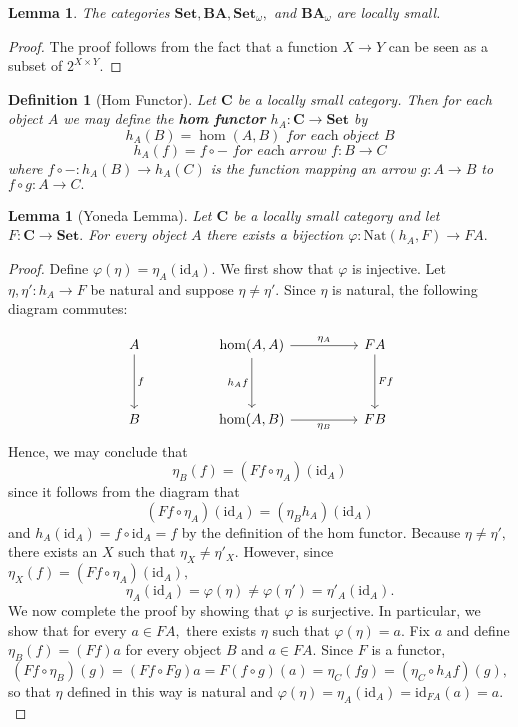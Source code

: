 \documentclass{article}
\newtheorem{lemma}[proposition]{Lemma}
\newtheorem{definition}[proposition]{Definition}
\numberwithin{equation}{section}
\newcommand{\cat}[1]{{\mathbf{#1}}}
\newcommand{\id}{\mathrm{id}}
\newcommand{\Nat}{\mathrm{Nat}}
\begin{document}
\begin{lemma}
The categories $\cat{Set}, \cat{BA}, \cat{Set}_\omega,$ and $\cat{BA}_\omega$ are locally small. 
\end{lemma}

\begin{proof}
The proof follows from the fact that a function $X \to Y$ can be seen as a subset of $2^{X \times Y}.$
\end{proof}

\begin{definition}[Hom Functor]
Let $\cat{C}$ be a locally small category. Then for each object $A$ we may define the \textbf{hom functor} $h_A : \cat{C} \to \cat{Set}$ by $$h_A(B) = \hom(A, B) \textit{ for each object } B$$ $$h_A(f) = f \circ - \textit{ for each arrow } f : B \to C$$ where $f \circ - : h_A(B) \to h_A(C)$ is the function mapping an arrow $g : A \to B$ to $f \circ g : A \to C.$
\end{definition}


\begin{lemma}[Yoneda Lemma]
Let $\cat{C}$ be a locally small category and let $F : \cat{C} \to \cat{Set}.$ For every object $A$ there exists a bijection $\varphi : \Nat(h_A, F) \to FA.$
\end{lemma}

\begin{proof}
Define $\varphi(\eta) = \eta_A(\id_A).$ We first show that $\varphi$ is injective. Let $\eta, \eta' : h_A \to F$ be natural and suppose $\eta \neq \eta'.$ Since $\eta$ is natural, the following diagram commutes:

$$
\begin{tikzcd}
	A && {\hom(A, A)} && FA \\
	\\
	B && {\hom(A, B)} && FB
	\arrow["f", from=1-1, to=3-1]
	\arrow["{h_Af}"', from=1-3, to=3-3]
	\arrow["{\eta_A}", from=1-3, to=1-5]
	\arrow["{\eta_B}"', from=3-3, to=3-5]
	\arrow["Ff", from=1-5, to=3-5]
\end{tikzcd}
$$
Hence, we may conclude that $$\eta_B(f) = (Ff \circ \eta_A)(\id_A)$$ since it follows from the diagram that $$(Ff \circ \eta_A)(\id_A) = (\eta_Bh_A)(\id_A)$$ and $h_A(\id_A) = f \circ \id_A = f$ by the definition of the hom functor. Because $\eta \neq \eta',$ there exists an $X$ such that $\eta_X \neq \eta'_X.$ However, since $\eta_X(f) = (Ff \circ \eta_A)(\id_A),$ $$\eta_A(\id_A) = \varphi(\eta) \neq \varphi(\eta') = \eta'_A(\id_A).$$ We now complete the proof by showing that $\varphi$ is surjective. In particular, we show that for every $a \in FA,$ there exists $\eta$ such that $\varphi(\eta) = a.$ Fix $a$ and define $\eta_B(f) = (Ff)a$ for every object $B$ and $a \in FA.$ Since $F$ is a functor, $$(Ff \circ \eta_B)(g) = (Ff \circ  Fg)a = F(f \circ g)(a) = \eta_C(fg) = (\eta_C \circ h_Af)(g),$$ so that $\eta$ defined in this way is natural and $\varphi(\eta) = \eta_A(\id_A) = \id_{FA}(a) = a.$
\end{proof}
\end{document}
